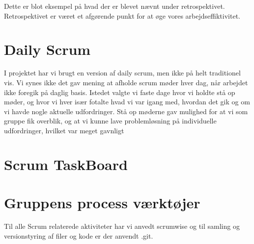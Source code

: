 Dette er blot eksempel på hvad der er blevet nævnt under retrospektivet. Retrospektivet er været et afgørende punkt for at øge vores arbejdseffiktivitet.

\section{Daily Scrum}
I projektet har vi brugt en version af daily scrum, men ikke på helt traditionel vis. Vi synes ikke det gav mening at afholde scrum møder hver dag, når arbejdet ikke foregik på daglig basis. Istedet valgte vi faste dage hvor vi holdte stå op møder, og hvor vi hver især fotalte hvad vi var igang med, hvordan det gik og om vi havde nogle aktuelle udfordringer. Stå op møderne gav mulighed for at vi som gruppe fik overblik, og at vi kunne lave problemløsning på individuelle udfordringer, hvilket var meget gavnligt

\section{Scrum TaskBoard}


\section{Gruppens process værktøjer}
Til alle Scrum relaterede aktiviteter har vi anvedt scrumwise og til samling og versionstyring af filer og kode er der anvendt .git. 


